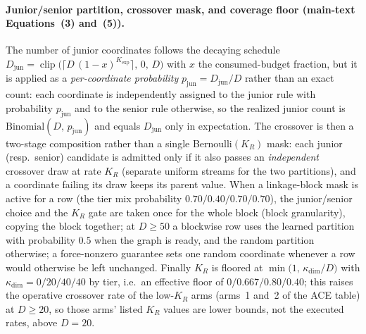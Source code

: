 \documentclass[algorithms,article,submit,moreauthors,pdftex]{Definitions/mdpi}
\begin{document}
\paragraph{Junior/senior partition, crossover mask, and coverage floor (main-text Equations~(3) and~(5)).}
The number of junior coordinates follows the decaying schedule
$D_{\mathrm{jun}} = \operatorname{clip}\!\bigl(\lceil D\,(1-x)^{K_{\exp}}\rceil,\,0,\,D\bigr)$
with $x$ the consumed-budget fraction, but it is applied as a \emph{per-coordinate
probability} $p_{\mathrm{jun}} = D_{\mathrm{jun}}/D$ rather than an exact count: each
coordinate is independently assigned to the junior rule with probability
$p_{\mathrm{jun}}$ and to the senior rule otherwise, so the realized junior count is
$\mathrm{Binomial}(D,\,p_{\mathrm{jun}})$ and equals $D_{\mathrm{jun}}$ only in
expectation.  The crossover is then a two-stage composition rather than a single
Bernoulli$(K_R)$ mask: each junior (resp.\ senior) candidate is admitted only if it
also passes an \emph{independent} crossover draw at rate $K_R$ (separate uniform
streams for the two partitions), and a coordinate failing its draw keeps its parent
value.  When a linkage-block mask is active for a row (the tier mix
probability $0.70/0.40/0.70/0.70$), the junior/senior choice and the $K_R$
gate are taken once for the whole block (block granularity), copying the block
together; at $D\ge50$ a blockwise row uses the learned partition with
probability $0.5$ when the graph is ready, and the random partition otherwise; a force-nonzero guarantee sets one random coordinate whenever a row would
otherwise be left unchanged.  Finally $K_R$ is floored at
$\min\!\bigl(1,\,\kappa_{\dim}/D\bigr)$ with $\kappa_{\dim}=0/20/40/40$ by tier, i.e.\
an effective floor of $0/0.667/0.80/0.40$; this raises the operative crossover rate of
the low-$K_R$ arms (arms~1 and~2 of the ACE table) at $D\ge 20$, so those arms' listed
$K_R$ values are lower bounds, not the executed rates, above $D=20$.
\end{document}
